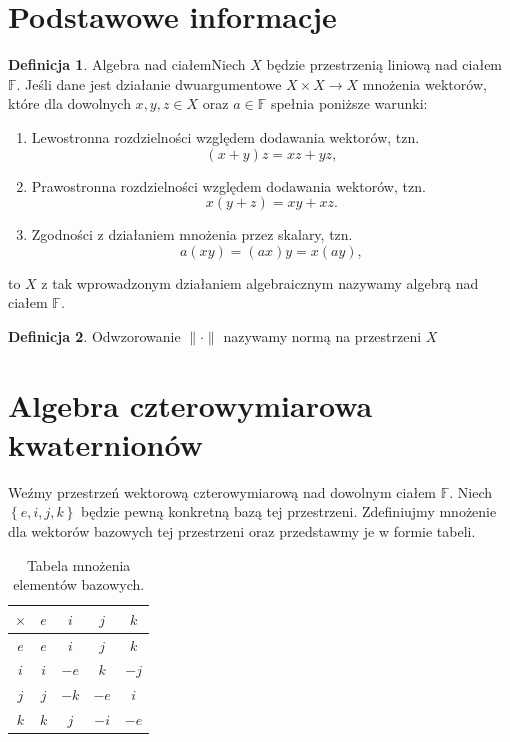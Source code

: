 \documentclass[a4paper,twoside,11pt,reqno]{mwrep}
\theoremstyle{plain} \newtheorem{twr}{Twierdzenie}
\theoremstyle{plain} \newtheorem{lem}{Lemat}
\theoremstyle{definition} \newtheorem{defi}{Definicja}
\theoremstyle{remark} \newtheorem*{wni}{Wniosek}
\theoremstyle{definition} \newtheorem{uwaga}{Uwaga}
\theoremstyle{definition}\newtheorem{prz}{Przykład}
\begin{document}
\chapter*{Podstawowe informacje}
\begin{defi}{Algebra nad ciałem}\label{defAlgebry}
Niech $X$ będzie przestrzenią liniową nad ciałem $\mathbb{F}$. Jeśli dane jest działanie dwuargumentowe 
$X\times X \rightarrow X$ mnożenia wektorów, które dla dowolnych $x,y,z\in X$ oraz $a\in\mathbb{F}$ spełnia poniższe warunki:
\begin{enumerate}
\item Lewostronna rozdzielności względem dodawania wektorów, tzn.
$$(x+y)z=xz+yz,$$
\item Prawostronna rozdzielności względem dodawania wektorów, tzn.
$$x(y+z)=xy+xz.$$
\item Zgodności z działaniem mnożenia przez skalary, tzn.
$$a(xy)=(ax)y=x(ay),$$
\end{enumerate}
to $X$ z tak wprowadzonym działaniem algebraicznym nazywamy algebrą nad ciałem $\mathbb{F}$.
\end{defi} 

\begin{defi}
Odwzorowanie
$\|\cdot \|$ nazywamy normą na przestrzeni $X$
\end{defi}

\chapter{Algebra czterowymiarowa kwaternionów}
Weźmy przestrzeń wektorową czterowymiarową nad dowolnym ciałem $\mathbb{F}$.
Niech $\left\{ e,i,j,k \right\}$ będzie pewną konkretną bazą tej przestrzeni.
Zdefiniujmy mnożenie dla wektorów bazowych tej przestrzeni oraz przedstawmy je w formie tabeli.\\

\begin{table}[h]
    \centering
      \caption{\label{table}Tabela mnożenia elementów bazowych.}
    \begin{tabular}{|c|c|c|c|c|}
        \hline
        \rowcolor{gray}$\times$ & $e$&$i$& $j$& $k$\\\hline 
         \cellcolor{gray}$e$&\cellcolor{gray!25}$e$&\cellcolor{gray!25}$i$
         &\cellcolor{gray!25}$j$&\cellcolor{gray!25}$k$\\ \hline
         \cellcolor{gray}$i$&\cellcolor{gray!25}$i$&\cellcolor{gray!25}$-e$&
         \cellcolor{gray!25}$k$&\cellcolor{gray!25}$-j$\\ \hline
         \cellcolor{gray}$j$&\cellcolor{gray!25}$j$&\cellcolor{gray!25}$-k$&\cellcolor{gray!25}$-e$&\cellcolor{gray!25}$i$\\ \hline
         \cellcolor{gray}$k$&\cellcolor{gray!25}$k$&\cellcolor{gray!25}$j$&
         \cellcolor{gray!25}$-i$&\cellcolor{gray!25}$-e$\\ \hline
    \end{tabular}

\end{table}
\end{document}
